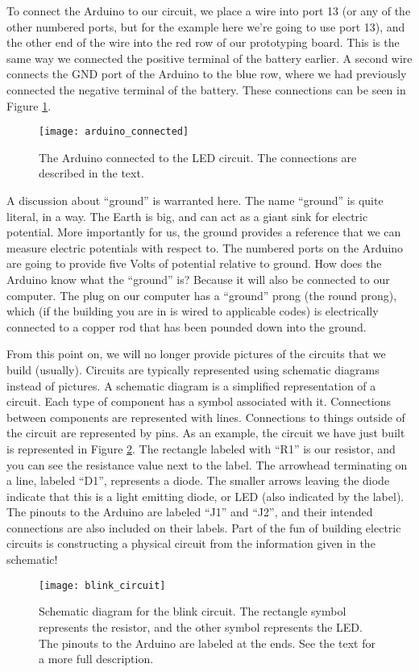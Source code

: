 To connect the Arduino to our circuit, we place a wire into port 13 (or any
of the other numbered ports, but for the example here we're going to use port
13), and the other end of the wire into the red row of our prototyping board.
This is the same way we connected the positive terminal of the battery earlier.
A second wire connects the GND port of the Arduino to the blue row, where we
had previously connected the negative terminal of the battery. These 
connections can be seen in Figure \ref{fig:arduino_connected}.
\begin{figure}[hbp!]
\centering
\texttt{[image: arduino\_connected]}
\caption[The Arduino connected to the LED circuit]{The Arduino connected to
the LED circuit. The connections are described in the text.}
\label{fig:arduino_connected}
\end{figure}

A discussion about ``ground'' is warranted here. The name ``ground'' is quite
literal, in a way. The Earth is big, and can act as a giant sink for electric
potential. More importantly for us, the ground provides a reference that we
can measure electric potentials with respect to. The numbered ports on the
Arduino are going to provide five Volts of potential relative to ground. How 
does the Arduino know what the ``ground'' is? Because it will also be connected
to our computer. The plug on our computer has a ``ground'' prong (the round
prong), which (if the building you are in is wired to applicable codes) is 
electrically connected to a copper rod that has been pounded down into the
ground.

From this point on, we will no longer provide pictures of the circuits that
we build (usually). Circuits are typically represented using schematic diagrams
instead of pictures. A schematic diagram is a simplified representation of
a circuit. Each type of component has a symbol associated with it. Connections
between components are represented with lines. Connections to things outside
of the circuit are represented by pins. As an example, the circuit we have
just built is represented in Figure \ref{fig:blink_circuit}. The rectangle 
labeled with ``R1'' is our resistor, and you can see the resistance value
next to the label. The arrowhead terminating on a line, labeled ``D1'', 
represents a diode. The smaller arrows leaving the diode indicate that this 
is a light emitting diode, or LED (also indicated by the label). The pinouts to 
the Arduino are labeled ``J1'' and ``J2'', and their intended connections are
also included on their labels. Part of the fun of building electric circuits is 
constructing a physical circuit 
from the information given in the schematic!
\begin{figure}[hbp!]
\centering
\texttt{[image: blink\_circuit]}
\caption[Schematic diagram for the blink circuit]{Schematic diagram for the
blink circuit. The rectangle symbol represents the resistor, and the other
symbol represents the LED. The pinouts to the Arduino are labeled at the ends.
See the text for a more full description.}
\label{fig:blink_circuit}
\end{figure}

